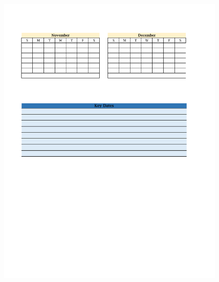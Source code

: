 \begin{mybox}[width=\textwidth]

\includegraphics[width=4.5in,height=7in]{Calendar2.pdf}

\end{mybox}

\mypage

